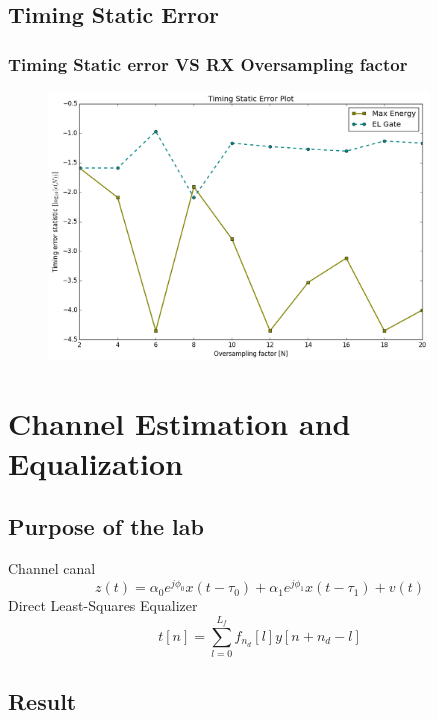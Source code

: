 \documentclass[11pt]{beamer}
\begin{document}
\subsection{Timing Static Error}
\begin{frame}

\frametitle{Timing Static error VS RX Oversampling factor}
\begin{figure}
\includegraphics[width=0.9\textwidth]{img/Timing-Static-Error.png}
\end{figure}

\end{frame}

\section{Channel Estimation and Equalization}
\subsection{Purpose of the lab}
\begin{frame}
Channel canal
\begin{equation}
z(t) = \alpha_0 e^{j\phi_0}x(t-\tau_0) + \alpha_1 e^{j\phi_1}x(t-\tau_1) + v(t)
\end{equation}
Direct Least-Squares Equalizer
\begin{equation}
t[n] = \sum_{l=0}^{L_f} {f_{n_d}[l]y[n + n_d -l ]}
\end{equation}
\end{frame}
\subsection{Result}
\end{document}
